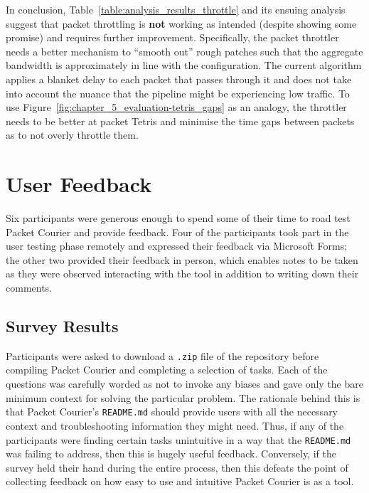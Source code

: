 In conclusion, Table~\ref{table:analysis_results_throttle} and its ensuing analysis suggest that packet throttling is
\textbf{not} working as intended (despite showing some promise) and requires further improvement. Specifically, the
packet throttler needs a better mechanism to ``smooth out'' rough patches such that the aggregate bandwidth is
approximately in line with the configuration. The current algorithm applies a blanket delay to each packet that
passes through it and does not take into account the nuance that the pipeline might be experiencing low traffic. To
use Figure~\ref{fig:chapter_5_evaluation-tetris_gaps} as an analogy, the throttler needs to be better at packet
Tetris and minimise the time gaps between packets as to not overly throttle them.


\section{User Feedback}\label{section:user_feedback}

Six participants were generous enough to spend some of their time to road test Packet Courier and provide feedback.
Four of the participants took part in the user testing phase remotely and expressed their feedback via Microsoft
Forms\cite{microsoft_forms}; the other two provided their feedback in person, which enables notes to be taken as they
were observed interacting with the tool in addition to writing down their comments.

\subsection{Survey Results}\label{subsection:survey_results}

Participants were asked to download a \texttt{.zip} file of the repository before compiling Packet Courier and
completing a selection of tasks. Each of the questions was carefully worded as not to invoke any biases and gave only
the bare minimum context for solving the particular problem. The rationale behind this is that Packet Courier's
\texttt{README.md} should provide users with all the necessary context and troubleshooting information they might
need. Thus, if any of the participants were finding certain tasks unintuitive in a way that the \texttt{README.md}
was failing to address, then this is hugely useful feedback. Conversely, if the survey held their hand during the
entire process, then this defeats the point of collecting feedback on how easy to use and intuitive Packet Courier is
as a tool.

